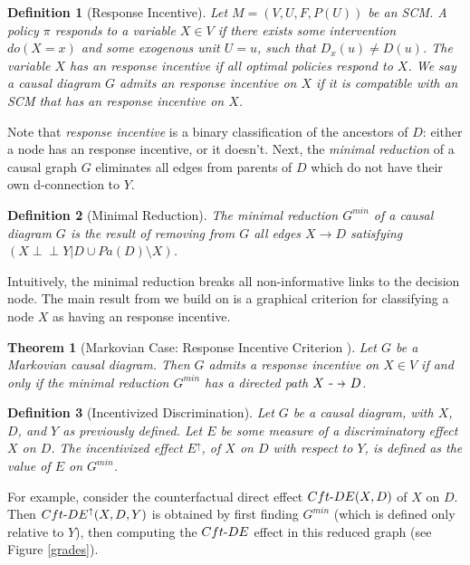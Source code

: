 \documentclass[letterpaper,10pt]{article}
\newtheorem{theorem}{Theorem}
\newtheorem{definition}{Definition}
\newcommand\dashto{\mathrel{
  -\mkern-6mu{\to}\mkern-20mu{\color{white}\bullet}\mkern12mu
}}
\newcommand\indep{\perp \!\!\! \perp}
\begin{document}
\begin{definition}[Response Incentive]
Let $M=(V,U,F,P(U))$ be an SCM. A policy $\pi$ responds to a variable $X\in V$ if there exists some intervention $do(X=x)$ and some exogenous unit $U=u$, such that $D_x(u) \neq D(u)$. The variable $X$ has an \emph{response incentive} if all optimal policies respond to $X$.
We say a causal diagram $G$ \emph{admits} an response incentive on $X$ if it is compatible with an SCM that has an response incentive on $X$.
\end{definition}

Note that \emph{response incentive} is a binary classification of the ancestors of $D$: either a node has an response incentive, or it doesn't.
Next, the \emph{minimal reduction} of a causal graph $G$ eliminates all edges from parents of $D$ which do not have their own d-connection to $Y$.

\begin{definition}[Minimal Reduction]
The \emph{minimal reduction} $G^{min}$ of a causal diagram $G$ is the result of removing from $G$ all edges $X\rightarrow D$ satisfying $(X\indep Y | D \cup Pa(D) \setminus X)$.
\end{definition}

Intuitively, the minimal reduction breaks all non-informative links to the decision node.
The main result from \cite{everitt2021agent} we build on is a graphical criterion for classifying a node $X$ as having an response incentive.


\begin{theorem}[Markovian Case: Response Incentive Criterion \cite{everitt2021agent}]\label{markov}
Let $G$ be a Markovian causal diagram. Then $G$ admits a response incentive on $X\in V$ if and only if the minimal reduction $G^{min}$ has a directed path $X\dashto D$.
\end{theorem}

\begin{definition}[Incentivized Discrimination]
Let $G$ be a causal diagram, with $X$, $D$, and $Y$ as previously defined. Let $E$ be some measure of a discriminatory effect $X$ on $D$. The \emph{incentivized effect} $E^\uparrow$, of $X$ on $D$ with respect to $Y$, is defined as the value of $E$ on $G^{min}$. 
\end{definition}

For example, consider the counterfactual direct effect $Cft{\text -}DE(X,D)$  of $X$ on $D$. Then $Cft{\text -}DE^\uparrow(X,D,Y)$ is obtained by first finding $G^{min}$ (which is defined only relative to $Y$), then computing the $Cft{\text -}DE$ effect in this reduced graph (see Figure \ref{grades}).
\end{document}
